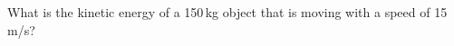 \documentclass[answers]{exam}
\begin{document}
\begin{questions}















\question %
What is the kinetic energy of a 150\,kg object that is moving with a speed of 15\,m/s? 

\begin{solution}
\phantom{.}


\end{solution}
\end{questions}
\end{document}
